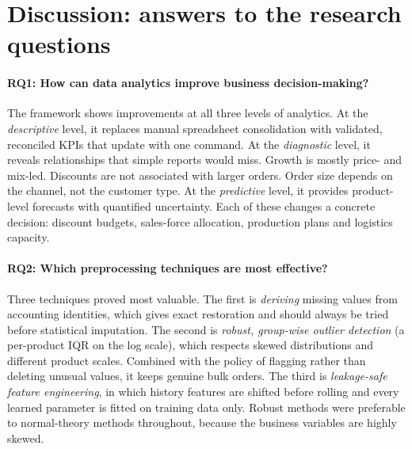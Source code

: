 \section{Discussion: answers to the research questions}\label{ch:discussion}

\paragraph{RQ1: How can data analytics improve business decision-making?}
The framework shows improvements at all three levels of analytics. At the \emph{descriptive} level, it replaces
manual spreadsheet consolidation with validated, reconciled KPIs that update with one command. At the
\emph{diagnostic} level, it reveals relationships that simple reports would miss. Growth is mostly price- and
mix-led. Discounts are not associated with larger orders. Order size depends on the channel, not the customer
type. At the \emph{predictive} level, it provides product-level forecasts with quantified uncertainty. Each of
these changes a concrete decision: discount budgets, sales-force allocation, production plans and logistics
capacity.

\paragraph{RQ2: Which preprocessing techniques are most effective?}
Three techniques proved most valuable. The first is \emph{deriving} missing values from accounting identities,
which gives exact restoration and should always be tried before statistical imputation. The second is
\emph{robust, group-wise outlier detection} (a per-product IQR on the log scale), which respects skewed
distributions and different product scales. Combined with the policy of flagging rather than deleting unusual
values, it keeps genuine bulk orders. The third is \emph{leakage-safe feature engineering}, in which history
features are shifted before rolling and every learned parameter is fitted on training data only. Robust
methods were preferable to normal-theory methods throughout, because the business variables are highly skewed.

